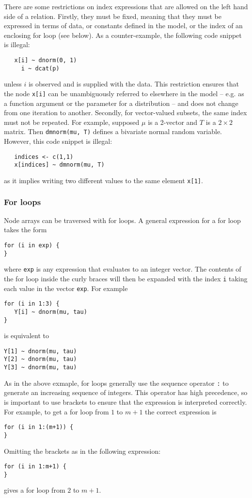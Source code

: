 \documentclass[11pt, a4paper, titlepage]{report}
\begin{document}
There are some restrictions on index expressions that are allowed on
the left hand side of a relation. Firstly, they must be fixed, meaning
that they must be expressed in terms of data, or constants defined in
the model, or the index of an enclosing for loop (see below).  As
a counter-example, the following code snippet is illegal:
\begin{verbatim}
   x[i] ~ dnorm(0, 1)
     i ~ dcat(p)
\end{verbatim}
unless $i$ is observed and is supplied with the data. This restriction
ensures that the node \verb+x[i]+ can be unambiguously referred to
elsewhere in the model -- e.g. as a function argument or the parameter
for a distribution -- and does not change from one iteration to
another. Secondly, for vector-valued subsets, the same index must not
be repeated. For example, supposed $\mu$ is a 2-vector and $T$ is a
$2 \times 2$ matrix. Then \verb+dmnorm(mu, T)+ defines a bivariate
normal random variable.  However, this code snippet is illegal:
\begin{verbatim}
   indices <- c(1,1)
   x[indices] ~ dmnorm(mu, T)
\end{verbatim}
as it implies writing two different values to the same element \verb+x[1]+.

\subsubsection{For loops}

Node arrays can be traversed with for loops. 
A general expression for a for loop takes the form
\begin{verbatim}
for (i in exp) {
}
\end{verbatim}
where \texttt{exp} is any expression that evaluates to an integer
vector. The contents of the for loop inside the curly braces will then
be expanded with the index \texttt{i} taking each value in the vector
\texttt{exp}. For example
\begin{verbatim}
for (i in 1:3) {
   Y[i] ~ dnorm(mu, tau)
}
\end{verbatim}
is equivalent to
\begin{verbatim}
Y[1] ~ dnorm(mu, tau)
Y[2] ~ dnorm(mu, tau)
Y[3] ~ dnorm(mu, tau)
\end{verbatim}
As in the above exmaple, for loops generally use the sequence operator
\verb+:+ to generate an increasing sequence of integers. This operator
has high precedence, so is important to use brackets to ensure that
the expression is interpreted correctly. For example, to get a for
loop from $1$ to $m+1$ the correct expression is
\begin{verbatim}
for (i in 1:(m+1)) {
}
\end{verbatim}
Omitting the brackets as in the following expression:
\begin{verbatim}
for (i in 1:m+1) {
}
\end{verbatim}
gives a for loop from $2$ to $m+1$.
\end{document}
